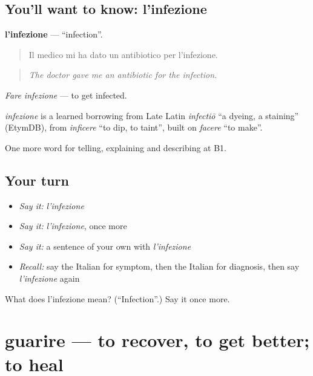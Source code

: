 \subsection*{You'll want to know: l'infezione}
\textbf{l'infezione} — \textquotedblleft{}infection\textquotedblright{}.

\begin{quote}
Il medico mi ha dato un antibiotico per l'infezione.
\end{quote}

\begin{quote}
\emph{The doctor gave me an antibiotic for the infection.}
\end{quote}

\emph{Fare infezione} — to get infected.

\begin{cousinweb}
\emph{infezione} is a learned borrowing from Late Latin \emph{infectiō} \textquotedblleft{}a dyeing, a staining\textquotedblright{} (EtymDB), from \emph{inficere} \textquotedblleft{}to dip, to taint\textquotedblright{}, built on \emph{facere} \textquotedblleft{}to make\textquotedblright{}.
\end{cousinweb}

\begin{grammarlens}[title={What you've built}]
One more word for telling, explaining and describing at B1.
\end{grammarlens}

\subsection*{Your turn}
\begin{itemize}
\raggedright
  \item \emph{Say it:} \emph{l'infezione}
  \item \emph{Say it:} \emph{l'infezione}, once more
  \item \emph{Say it:} a sentence of your own with \emph{l'infezione}
  \item \emph{Recall:} say the Italian for symptom, then the Italian for diagnosis, then say \emph{l'infezione} again
\end{itemize}

\begin{tcolorbox}[breakable,colback=teal!4,colframe=teal!35!black,title={Before you move on}]
What does l'infezione mean? (\textquotedblleft{}Infection\textquotedblright{}.) Say it once more.
\end{tcolorbox}
\section[guarire]{guarire — to recover, to get better; to heal}

